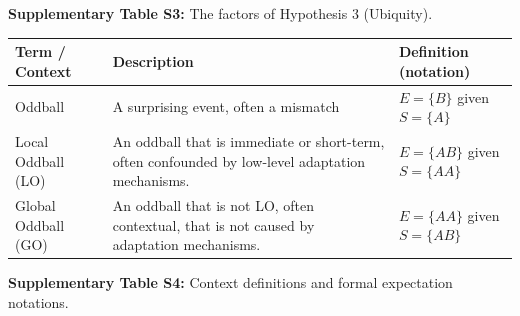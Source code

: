 \documentclass[12pt]{article}
\begin{document}
\noindent\textbf{Supplementary Table S3:} The factors of Hypothesis 3 (Ubiquity).

\vspace{1.5em}

\begingroup
\small
\noindent\begin{tabularx}{\textwidth}{@{}l p{2.8in} >{\raggedright\arraybackslash}X@{}}
\toprule
\textbf{Term / Context} & \textbf{Description} & \textbf{Definition (notation)} \\
\midrule
Oddball & A surprising event, often a mismatch & $E = \{B\}$ given $S = \{A\}$ \\
Local Oddball (LO) & An oddball that is immediate or short-term, often confounded by low-level adaptation mechanisms. & $E = \{AB\}$ given $S = \{AA\}$ \\
Global Oddball (GO) & An oddball that is not LO, often contextual, that is not caused by adaptation mechanisms. & $E = \{AA\}$ given $S = \{AB\}$ \\
\bottomrule
\end{tabularx}
\endgroup
\vspace{0.4em}

\noindent\textbf{Supplementary Table S4:} Context definitions and formal expectation notations.

\newpage
\end{document}
